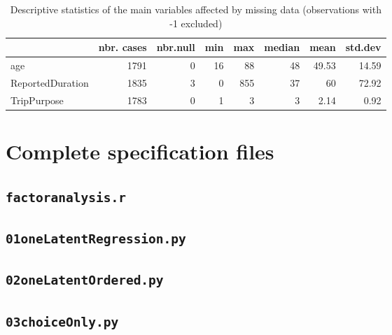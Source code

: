 \documentclass[12pt,a4paper]{article}
\begin{document}
\begin{table}[htbp]
\caption{\label{tab9}
Descriptive statistics of the main variables affected by missing data (observations with -1 excluded)}
\vspace{0.2cm}
\begin{tabular}{|l|r|r|r|r|r|r|r|}
\hline
\multicolumn{1}{|r|}{} & \multicolumn{1}{l|}{nbr. cases} & \multicolumn{1}{l|}{nbr.null} &  \multicolumn{1}{l|}{min} & \multicolumn{1}{l|}{max} & \multicolumn{1}{l|}{median} & \multicolumn{1}{l|}{mean} & \multicolumn{1}{l|}{std.dev} \\ \hline
age & 1791 & 0  & 16 & 88 & 48 & 49.53 & 14.59 \\ \hline
ReportedDuration & 1835 & 3 & 0 & 855 & 37 & 60 & 72.92 \\ \hline
TripPurpose & 1783 & 0  & 1 & 3 & 3 & 2.14 & 0.92 \\ \hline
\end{tabular}
\end{table}

\clearpage

\section{Complete specification files}

\subsection{\lstinline$factoranalysis.r$}
\label{sec:factoranalysis}


\subsection{\lstinline$01oneLatentRegression.py$}
\label{sec:01oneLatentRegression}


\subsection{\lstinline$02oneLatentOrdered.py$}
\label{sec:02oneLatentOrdered}


\subsection{\lstinline$03choiceOnly.py$}
\label{sec:03choiceOnly}

\end{document}
